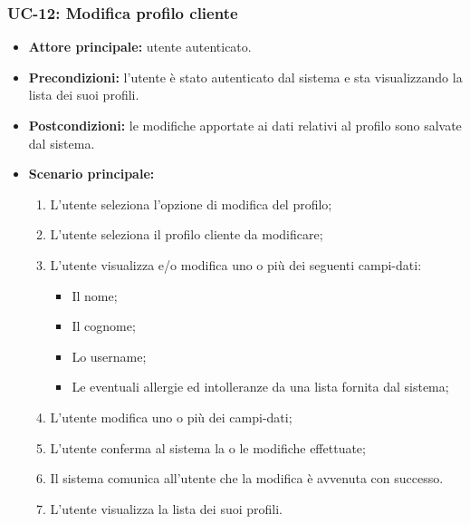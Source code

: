 \subsubsection{UC-12: Modifica profilo cliente}
\begin{itemize}
\item \textbf{Attore principale:} utente autenticato.
\item \textbf{Precondizioni:} l'utente è stato autenticato dal sistema e sta visualizzando la lista dei suoi profili.
\item \textbf{Postcondizioni:} le modifiche apportate ai dati relativi al profilo sono salvate dal sistema.
\item \textbf{Scenario principale:}
\begin{enumerate}
    \item L'utente seleziona l'opzione di modifica del profilo;
    \item L'utente seleziona il profilo cliente da modificare;
    \item L'utente visualizza e/o modifica uno o più dei seguenti campi-dati:
        \begin{itemize}
            \item Il nome;
            \item Il cognome;
            \item Lo username;
            \item Le eventuali allergie ed intolleranze da una lista fornita dal sistema;
        \end{itemize}
    \item L'utente modifica uno o più dei campi-dati;
    \item L'utente conferma al sistema la o le modifiche effettuate;
    \item Il sistema comunica all'utente che la modifica è avvenuta con successo.
    \item L'utente visualizza la lista dei suoi profili.
\end{enumerate}
\end{itemize}

